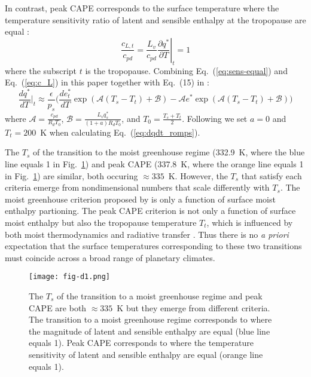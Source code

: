 \documentclass[draft]{ametsocV6.1}
\begin{document}
In contrast, peak CAPE corresponds to the surface temperature where the temperature sensitivity ratio of latent and sensible enthalpy at the tropopause are equal \citep[which works well for $a\ll1$,][]{romps2016}:
\begin{equation}
\frac{c_{L,t}}{c_{pd}} = \frac{L_v}{c_{pd}} \left. \frac{\partial q^*}{\partial T} \right|_t = 1
\label{eq:sens-equal}
\end{equation}
where the subscript $t$ is the tropopause. Combining Eq.~(\ref{eq:sens-equal}) and Eq.~(\ref{eq:c_L}) in this paper together with Eq.~(15) in \cite{romps2016}:
\begin{equation}
\frac{d q^*}{d T} \biggl|_t \approx \frac{\epsilon}{p_s} \biggl( \frac{d e_t^*}{d T} \exp( \mathcal{A} (T_s - T_t) + \mathcal{B}) - \mathcal{A} e^* \exp( \mathcal{A} (T_s - T_t) + \mathcal{B}) \biggl)
\label{eq:dqdt_romps}
\end{equation}
where $\mathcal{A} = \frac{c_{pd}}{R_d T_0}$, $\mathcal{B} = \frac{L_v q_s^*}{(1 + a) R_d T_0}$, and $T_0 = \frac{T_s + T_t}{2}$. Following \cite{romps2016} we set $a=0$ and $T_t=200$~K when calculating Eq.~(\ref{eq:dqdt_romps}).

The $T_s$ of the transition to the moist greenhouse regime (332.9~K, where the blue line equals 1 in Fig.~\ref{fig:fig-d1}) and peak CAPE (337.8~K, where the orange line equals 1 in Fig.~\ref{fig:fig-d1}) are similar, both occuring $\approx335$~K. However, the $T_s$ that satisfy each criteria emerge from nondimensional numbers that scale differently with $T_s$. The moist greenhouse criterion proposed by \cite{wordsworth2013} is only a function of surface moist enthalpy partioning. The peak CAPE criterion is not only a function of surface moist enthalpy but also the tropopause temperature $T_t$, which is influenced by both moist thermodynamics and radiative transfer \citep[e.g.,][]{held1982, hu2019a}. Thus there is no \textit{a priori} expectation that the surface temperatures corresponding to these two transitions must coincide across a broad range of planetary climates.

\begin{figure}[htbp]
 \centering
 \texttt{[image: fig-d1.png]}
 \caption{The $T_s$ of the transition to a moist greenhouse regime and peak CAPE are both $\approx 335$~K but they emerge from different criteria. The transition to a moist greenhouse regime corresponds to where the magnitude of latent and sensible enthalpy are equal (blue line equals 1). Peak CAPE corresponds to where the temperature sensitivity of latent and sensible enthalpy are equal (orange line equals 1).}\label{fig:fig-d1}
\end{figure}

\clearpage




\end{document}
